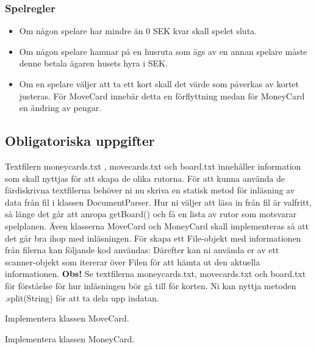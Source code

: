 \subsubsection{Spelregler}

\begin{itemize}
\item Om någon spelare har mindre än 0 SEK kvar skall spelet sluta.
\item Om någon spelare hamnar på en husruta som ägs av en annan spelare måste denne betala ägaren husets hyra i SEK.
\item Om en spelare väljer att ta ett kort skall det värde som påverkas av kortet justeras. För MoveCard innebär detta en förflyttning medan för MoneyCard en ändring av pengar.

\end{itemize}



\subsection{Obligatoriska uppgifter}

\Task Textfilern moneycards.txt , movecards.txt och board.txt innehåller information som skall nyttjas för att skapa de olika rutorna. För att kunna använda de färdiskrivna textfilerna behöver ni nu skriva en statisk metod för inläsning av data från fil i klassen DocumentParser. Hur ni väljer att läsa in från fil är valfritt,  så länge det går att anropa getBoard() och få en lista av rutor som motsvarar spelplanen. Även klasserna MoveCard och MoneyCard skall implementeras så att det går bra ihop med inläsningen.
För skapa ett File-objekt med informationen från filerna kan följande kod användas:
\newline
\newline
{}
\newline
{}
\newline
\newline
Därefter kan ni använda er av ett scanner-objekt som itererar över Filen för att hämta ut den aktuella informationen.
\noindent
\textbf{Obs!} Se textfilerna moneycards.txt, movecards.txt och board.txt för förståelse för hur inläsningen bör gå till för korten.  Ni kan nyttja metoden .split(String) för att ta dela upp indatan.

\Subtask Implementera klassen MoveCard.

\Subtask Implementera klassen MoneyCard.

